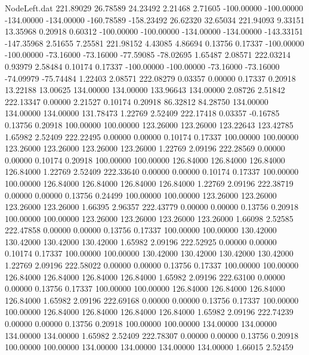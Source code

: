 \begin{filecontents}{NodeLeft.dat}
 221.89029   26.78589   24.23492     2.21468    2.71605 -100.00000 -100.00000 -134.00000 -134.00000 -160.78589 -158.23492   26.62320   32.65034
 221.94093    9.33151   13.35968     0.20918    0.60312 -100.00000 -100.00000 -134.00000 -134.00000 -143.33151 -147.35968    2.51655    7.25581
 221.98152    4.43085    4.86694     0.13756    0.17337 -100.00000 -100.00000  -73.16000  -73.16000  -77.59085  -78.02695    1.65487    2.08571
 222.03214    0.93979    2.58484     0.10174    0.17337 -100.00000 -100.00000  -73.16000  -73.16000  -74.09979  -75.74484    1.22403    2.08571
 222.08279    0.03357    0.00000     0.17337    0.20918   13.22188   13.00625  134.00000  134.00000  133.96643  134.00000    2.08726    2.51842
 222.13347    0.00000    2.21527     0.10174    0.20918   86.32812   84.28750  134.00000  134.00000  134.00000  131.78473    1.22769    2.52409
 222.17418    0.03357   -0.16785     0.13756    0.20918  100.00000  100.00000  123.26000  123.26000  123.22643  123.42785    1.65982    2.52409
 222.22495    0.00000    0.00000     0.10174    0.17337  100.00000  100.00000  123.26000  123.26000  123.26000  123.26000    1.22769    2.09196
 222.28569    0.00000    0.00000     0.10174    0.20918  100.00000  100.00000  126.84000  126.84000  126.84000  126.84000    1.22769    2.52409
 222.33640    0.00000    0.00000     0.10174    0.17337  100.00000  100.00000  126.84000  126.84000  126.84000  126.84000    1.22769    2.09196
 222.38719    0.00000    0.00000     0.13756    0.24499  100.00000  100.00000  123.26000  123.26000  123.26000  123.26000    1.66395    2.96357
 222.43779    0.00000    0.00000     0.13756    0.20918  100.00000  100.00000  123.26000  123.26000  123.26000  123.26000    1.66098    2.52585
 222.47858    0.00000    0.00000     0.13756    0.17337  100.00000  100.00000  130.42000  130.42000  130.42000  130.42000    1.65982    2.09196
 222.52925    0.00000    0.00000     0.10174    0.17337  100.00000  100.00000  130.42000  130.42000  130.42000  130.42000    1.22769    2.09196
 222.58022    0.00000    0.00000     0.13756    0.17337  100.00000  100.00000  126.84000  126.84000  126.84000  126.84000    1.65982    2.09196
 222.63100    0.00000    0.00000     0.13756    0.17337  100.00000  100.00000  126.84000  126.84000  126.84000  126.84000    1.65982    2.09196
 222.69168    0.00000    0.00000     0.13756    0.17337  100.00000  100.00000  126.84000  126.84000  126.84000  126.84000    1.65982    2.09196
 222.74239    0.00000    0.00000     0.13756    0.20918  100.00000  100.00000  134.00000  134.00000  134.00000  134.00000    1.65982    2.52409
 222.78307    0.00000    0.00000     0.13756    0.20918  100.00000  100.00000  134.00000  134.00000  134.00000  134.00000    1.66015    2.52459

\end{filecontents}
